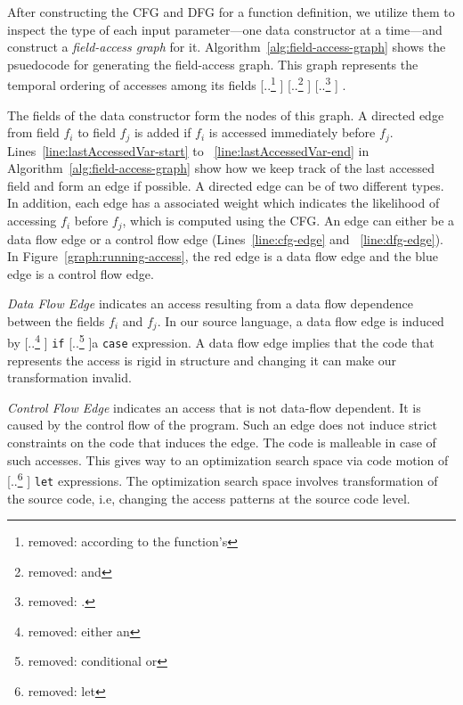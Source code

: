 \documentclass[acmsmall,review,anonymous]{acmart}\settopmatter{printfolios=true,printccs=false,printacmref=false}
\newcommand{\Figref}[1]{Figure~\ref{#1}\xspace}
\newcommand{\CFG}[0]{CFG\xspace}
\newcommand{\DFG}[0]{DFG\xspace}
\providecommand{\DIFaddtex}[1]{{\protect\color{blue} \sf #1}} %
\providecommand{\DIFdeltex}[1]{{\protect\color{red} [..\footnote{removed: #1} ]}} %
\providecommand{\DIFaddbegin}{} %
\providecommand{\DIFaddend}{} %
\providecommand{\DIFdelbegin}{} %
\providecommand{\DIFdelend}{} %
\providecommand{\DIFadd}[1]{\texorpdfstring{\DIFaddtex{#1}}{#1}} %
\providecommand{\DIFdel}[1]{\texorpdfstring{\DIFdeltex{#1}}{}} %
\newcommand{\DIFscaledelfig}{0.5}
\newlength{\DIFdelgraphicswidth} %
\newlength{\DIFdelgraphicsheight} %
\newcommand{\DIFaddincludegraphics}[2][]{{\color{blue}\fbox{\DIFOincludegraphics[#1]{#2}}}} %
\newcommand{\DIFdelincludegraphics}[2][]{%
\sbox{\DIFdelgraphicsbox}{\DIFOincludegraphics[#1]{#2}}%
\settoboxwidth{\DIFdelgraphicswidth}{\DIFdelgraphicsbox} %
\settoboxtotalheight{\DIFdelgraphicsheight}{\DIFdelgraphicsbox} %
\scalebox{\DIFscaledelfig}{%
\parbox[b]{\DIFdelgraphicswidth}{\usebox{\DIFdelgraphicsbox}\\[-\baselineskip] \rule{\DIFdelgraphicswidth}{0em}}\llap{\resizebox{\DIFdelgraphicswidth}{\DIFdelgraphicsheight}{%
\setlength{\unitlength}{\DIFdelgraphicswidth}%
\begin{picture}(1,1)%
\thicklines\linethickness{2pt} %
{\color[rgb]{1,0,0}\put(0,0){\framebox(1,1){}}}%
{\color[rgb]{1,0,0}\put(0,0){\line( 1,1){1}}}%
{\color[rgb]{1,0,0}\put(0,1){\line(1,-1){1}}}%
\end{picture}%
}\hspace*{3pt}}} %
} %
\DeclareRobustCommand{\DIFaddbegin}{\DIFOaddbegin \let\includegraphics\DIFaddincludegraphics} %
\DeclareRobustCommand{\DIFaddend}{\DIFOaddend \let\includegraphics\DIFOincludegraphics} %
\DeclareRobustCommand{\DIFdelbegin}{\DIFOdelbegin \let\includegraphics\DIFdelincludegraphics} %
\DeclareRobustCommand{\DIFdelend}{\DIFOaddend \let\includegraphics\DIFOincludegraphics} %
\begin{document}
\DIFaddend {}

\DIFdelbegin %
\DIFdelend After constructing the \CFG and \DFG for a function definition, we \DIFaddbegin \DIFadd{utilize them to }\DIFaddend inspect the type
of each input parameter---one data constructor at a time---and construct
a \emph{field-access graph} for it.
\DIFaddbegin \DIFadd{Algorithm~\ref{alg:field-access-graph} shows the psuedocode for generating the field-access graph. 
}\DIFaddend This graph represents the temporal ordering of accesses among its fields\DIFdelbegin \DIFdel{according to the function's }%
\DIFdel{and }%
\DIFdel{.
}\DIFdelend \DIFaddbegin \DIFadd{.
}

\DIFaddend The fields of the data constructor form the nodes of this graph.
A directed edge from field $f_i$ to field $f_j$ is added if $f_i$ is accessed immediately before $f_j$. \DIFaddbegin \DIFadd{Lines~\ref{line:lastAccessedVar-start} to ~\ref{line:lastAccessedVar-end}
in Algorithm~\ref{alg:field-access-graph} show how we keep track of the last accessed field and form an edge if possible. 
}\DIFaddend A directed edge can be of two different types. In addition, each edge has a associated weight which indicates the likelihood of accessing $f_i$ before $f_j$, which is computed using the \CFG.
An edge can either be a data flow edge or a control flow edge \DIFaddbegin \DIFadd{(Lines~\ref{line:cfg-edge} and ~\ref{line:dfg-edge})}\DIFaddend . In \Figref{graph:running-access}, the red edge is a data flow edge and the blue edge is a control flow edge.

\textit{Data Flow Edge} indicates an access resulting from a data flow dependence between the fields $f_i$ and $f_j$. In our source language, a data flow edge is induced by
\DIFdelbegin \DIFdel{either an }%
{\color{red}%
\lstinline|if| %
}%
\DIFdel{conditional or }\DIFdelend a \lstinline|case| expression.
A data flow edge implies that the code that represents the access is rigid in structure and changing it can make our transformation invalid.

\textit{Control Flow Edge} indicates an access that is not data-flow dependent. It is caused by the control flow of the program. Such an edge does not induce strict constraints on the code that induces the edge. The code is malleable in case of such accesses. This gives way to an optimization search space via code motion of \DIFdelbegin \DIFdel{let }\DIFdelend \DIFaddbegin {\color{blue}%
\lstinline|let| %
}%
\DIFaddend expressions. The optimization search space involves transformation of the source code, i.e, changing the access patterns at the source code level.
\DIFdelbegin %
\DIFdelend 
\end{document}
